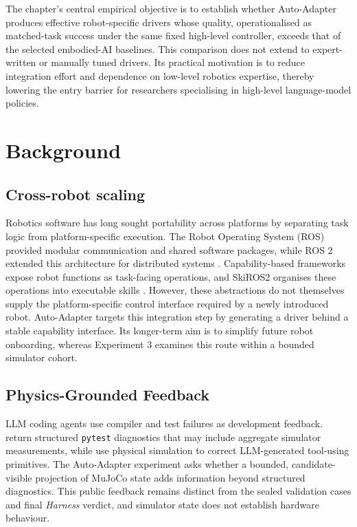 The chapter's central empirical objective is to establish whether Auto-Adapter
produces effective robot-specific drivers whose quality, operationalised as
matched-task success under the same fixed high-level controller, exceeds that
of the selected embodied-AI baselines. This comparison does not extend to
expert-written or manually tuned drivers. Its practical motivation is to reduce
integration effort and dependence on low-level robotics expertise, thereby
lowering the entry barrier for researchers specialising in high-level
language-model policies.

\section{Background}
\subsection{Cross-robot scaling}

Robotics software has long sought portability across platforms by separating
task logic from platform-specific execution. The Robot Operating System (ROS)
provided modular communication and shared software packages, while ROS 2
extended this architecture for distributed systems
\citep{quigley2009ros,macenski2022ros2}. Capability-based frameworks expose
robot functions as task-facing operations, and SkiROS2 organises these
operations into executable skills
\citep{pantano2022capabilitysurvey,mayr2023skiros2}. However, these abstractions
do not themselves supply the platform-specific control interface required by a
newly introduced robot. Auto-Adapter targets this integration step by
generating a driver behind a stable capability interface. Its longer-term aim
is to simplify future robot onboarding, whereas Experiment 3 examines this
route within a bounded simulator cohort.

\subsection{Physics-Grounded Feedback}

LLM coding agents use compiler and test failures as development feedback.
\citet{tripathi2026testdriven} return structured \texttt{pytest} diagnostics
that may include aggregate simulator measurements, while
\citet{kim2026physicalcorrection} use physical simulation to correct
LLM-generated tool-using primitives. The Auto-Adapter experiment asks whether
a bounded, candidate-visible projection of MuJoCo state adds information beyond
structured diagnostics. This public feedback remains distinct from the sealed
validation cases and final \emph{Harness} verdict, and simulator state does not
establish hardware behaviour.

